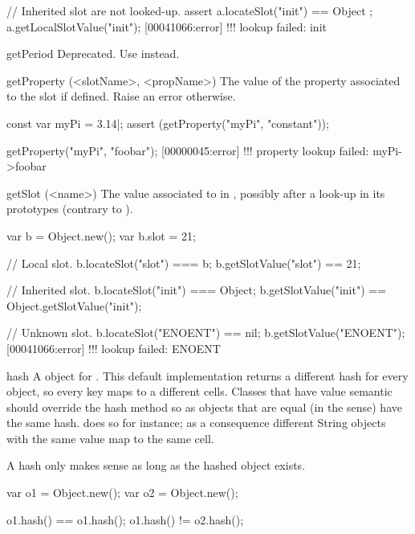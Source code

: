 \begin{urbiscriptapi}
\begin{urbiscript}
// Inherited slot are not looked-up.
assert { a.locateSlot("init") == Object };
a.getLocalSlotValue("init");
[00041066:error] !!! lookup failed: init
\end{urbiscript}


\item[getPeriod]%
  Deprecated.  Use  instead.


\item[getProperty](<slotName>, <propName>)%
  The value of the  property associated to the slot
   if defined.  Raise an error otherwise.
\begin{urbiscript}
const var myPi = 3.14|;
assert (getProperty("myPi", "constant"));

getProperty("myPi", "foobar");
[00000045:error] !!! property lookup failed: myPi->foobar
\end{urbiscript}


\item[getSlot](<name>)%
  The value associated to  in \this, possibly after a look-up in
  its prototypes (contrary to ).
\begin{urbiassert}
var b = Object.new();
var b.slot = 21;

// Local slot.
b.locateSlot("slot") === b;
b.getSlotValue("slot") == 21;

// Inherited slot.
b.locateSlot("init") === Object;
b.getSlotValue("init") == Object.getSlotValue("init");

// Unknown slot.
b.locateSlot("ENOENT") == nil;
b.getSlotValue("ENOENT");
[00041066:error] !!! lookup failed: ENOENT
\end{urbiassert}


\item[hash]%
  A  object for \this.  This default implementation returns
  a different hash for every object, so every key maps to a different
  cells. Classes that have value semantic should override the hash method so
  as objects that are equal (in the  sense) have the
  same hash.  does so for instance; as a consequence
  different String objects with the same value map to the same cell.

  A hash only makes sense as long as the hashed object exists.

\begin{urbiassert}
var o1 = Object.new();
var o2 = Object.new();

o1.hash() == o1.hash();
o1.hash() != o2.hash();
\end{urbiassert}



\end{urbiscriptapi}
